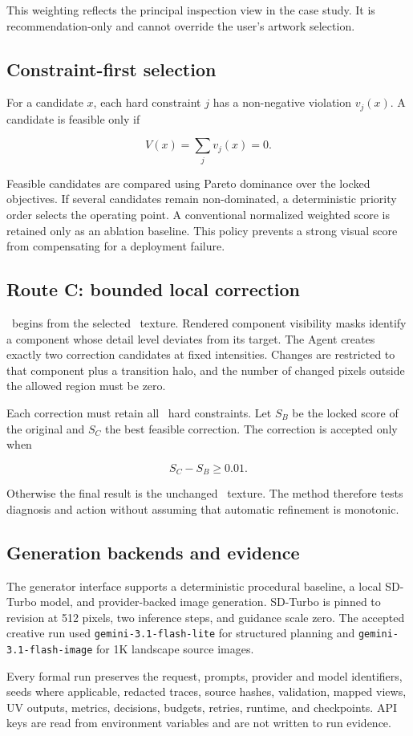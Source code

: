 This weighting reflects the principal inspection view in the case study. It is
recommendation-only and cannot override the user's artwork selection.

\subsection{Constraint-first selection}

For a candidate $x$, each hard constraint $j$ has a non-negative violation
$v_j(x)$. A candidate is feasible only if

\[
  V(x)=\sum_j v_j(x)=0.
\]

Feasible candidates are compared using Pareto dominance over the locked
objectives. If several candidates remain non-dominated, a deterministic priority
order selects the operating point. A conventional normalized weighted score is
retained only as an ablation baseline. This policy prevents a strong visual score
from compensating for a deployment failure.

\subsection{Route C: bounded local correction}

\routeC\ begins from the selected \routeB\ texture. Rendered component visibility
masks identify a component whose detail level deviates from its target. The Agent
creates exactly two correction candidates at fixed intensities. Changes are
restricted to that component plus a transition halo, and the number of changed
pixels outside the allowed region must be zero.

Each correction must retain all \routeB\ hard constraints. Let $S_B$ be the locked
score of the original and $S_C$ the best feasible correction. The correction is
accepted only when

\[
  S_C-S_B\geq0.01.
\]

Otherwise the final result is the unchanged \routeB\ texture. The method therefore
tests diagnosis and action without assuming that automatic refinement is
monotonic.

\subsection{Generation backends and evidence}

The generator interface supports a deterministic procedural baseline, a local
SD-Turbo model, and provider-backed image generation. SD-Turbo is pinned to
revision  at 512 pixels, two
inference steps, and guidance scale zero. The accepted creative run used
\texttt{gemini-3.1-flash-lite} for structured planning and
\texttt{gemini-3.1-flash-image} for 1K landscape source images.

Every formal run preserves the request, prompts, provider and model identifiers,
seeds where applicable, redacted traces, source hashes, validation, mapped views,
UV outputs, metrics, decisions, budgets, retries, runtime, and checkpoints. API
keys are read from environment variables and are not written to run evidence.
